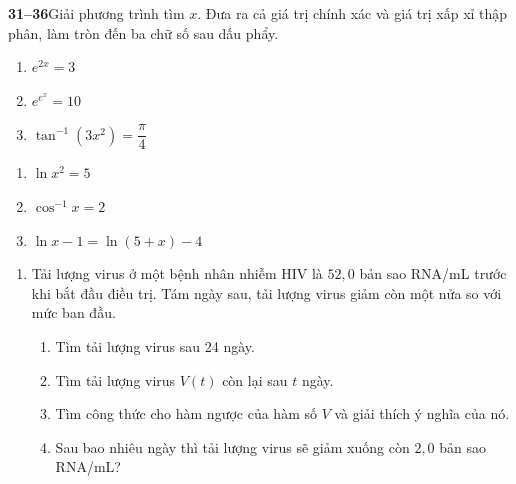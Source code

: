 \begin{minipage}[t]{0.485\textwidth}

\noindent
\textbf{\textsf{\color{stewartcyan}31--36}}\quad Giải phương trình tìm $x$. Đưa ra cả giá trị chính xác và giá trị xấp xỉ thập phân, làm tròn đến ba chữ số sau dấu phẩy.

\vspace{0.12cm}
\noindent
\begin{minipage}[t]{0.46\textwidth}
\begin{enumerate}[label=\textbf{\arabic*.}, leftmargin=*, itemsep=0.15cm]
    \item[\textbf{31.}] $e^{2x} = 3$
    \item[\textbf{33.}] $e^{e^x} = 10$
    \item[\textbf{35.}] $\tan^{-1}(3x^2) = \dfrac{\pi}{4}$
\end{enumerate}
\end{minipage}%
\hfill
\begin{minipage}[t]{0.52\textwidth}
\begin{enumerate}[label=\textbf{\arabic*.}, leftmargin=*, itemsep=0.15cm]
    \item[\textbf{32.}] $\ln x^2 = 5$
    \item[\textbf{34.}] $\cos^{-1} x = 2$
    \item[\textbf{36.}] $\ln x - 1 = \ln(5 + x) - 4$
\end{enumerate}
\end{minipage}

\vspace{0.2cm}
\noindent{\color{stewartcyan}\rule{\linewidth}{0.8pt}}
\vspace{0.08cm}

\begin{enumerate}[label=\textbf{\arabic*.}, leftmargin=*, start=37]
    \item Tải lượng virus ở một bệnh nhân nhiễm HIV là $52{,}0$ bản sao RNA/mL trước khi bắt đầu điều trị. Tám ngày sau, tải lượng virus giảm còn một nửa so với mức ban đầu.
    \begin{enumerate}[label=(\alph*), leftmargin=*]
        \item Tìm tải lượng virus sau 24 ngày.
        \item Tìm tải lượng virus $V(t)$ còn lại sau $t$ ngày.
        \item Tìm công thức cho hàm ngược của hàm số $V$ và giải thích ý nghĩa của nó.
        \item Sau bao nhiêu ngày thì tải lượng virus sẽ giảm xuống còn $2{,}0$ bản sao RNA/mL?
    \end{enumerate}


\end{enumerate}
\end{minipage}
